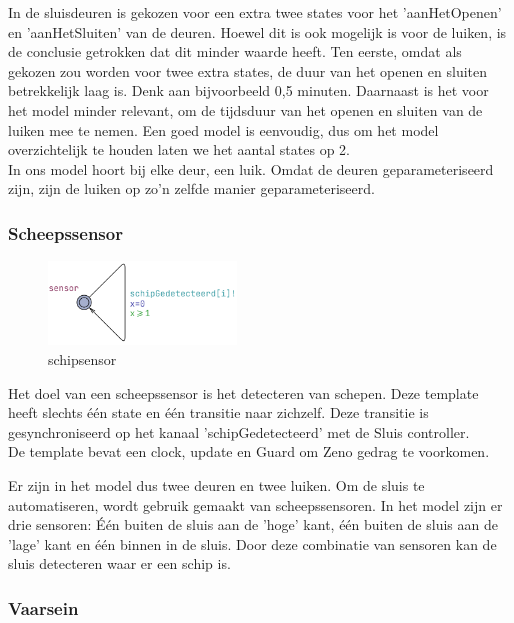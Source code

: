\documentclass{article} %
\begin{document}
In de sluisdeuren is gekozen voor een extra twee states voor het 'aanHetOpenen' en 'aanHetSluiten' van de deuren. Hoewel dit is ook mogelijk is voor de luiken, is de conclusie getrokken dat dit minder waarde heeft. Ten eerste, omdat als gekozen zou worden voor twee extra states, de duur van het openen en sluiten betrekkelijk laag is. Denk aan bijvoorbeeld 0,5 minuten. Daarnaast is het voor het model minder relevant, om de tijdsduur van het openen en sluiten van de luiken mee te nemen. Een goed model is eenvoudig, dus om het model overzichtelijk te houden laten we het aantal states op 2. \\
In ons model hoort bij elke deur, een luik. Omdat de deuren geparameteriseerd zijn, zijn de luiken op zo'n zelfde manier geparameteriseerd.

\subsubsection{Scheepssensor}
\begin{figure}[h]
    \includegraphics[width=5cm]{schipsensor.png}
    \centering    
    \caption{schipsensor}
\end{figure}

Het doel van een scheepssensor is het detecteren van schepen. Deze template heeft slechts één state en één transitie naar zichzelf. Deze transitie is gesynchroniseerd op het kanaal 'schipGedetecteerd' met de Sluis controller. \\
De template bevat een clock, update en Guard om Zeno gedrag te voorkomen. \par

Er zijn in het model dus twee deuren en twee luiken. Om de sluis te automatiseren, wordt gebruik gemaakt van scheepssensoren. In het model zijn er drie sensoren: Één buiten de sluis aan de 'hoge' kant, één buiten de sluis aan de 'lage' kant en één binnen in de sluis. Door deze combinatie van sensoren kan de sluis detecteren waar er een schip is. 

\newpage

\subsubsection{Vaarsein}
\end{document}
